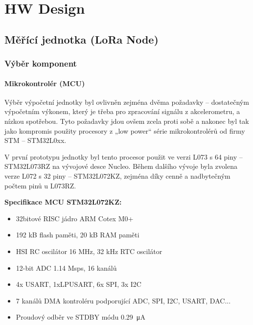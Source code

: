 \chapter{HW Design}
\section{Měřící jednotka (LoRa Node)}

\subsection{Výběr komponent}
\subsubsection{Mikrokontrolér (MCU)}
    Výběr výpočetní jednotky byl ovlivněn zejména dvěma požadavky – dostatečným výpočetním výkonem, který je třeba pro zpracování signálu z akcelerometru, a nízkou spotřebou. Tyto požadavky jdou ovšem zcela proti sobě a nakonec byl tak jako kompromis použity procesory z „low power“ série mikrokontrolérů od firmy STM – STM32L0xx.
    
    V první prototypu jednotky byl tento procesor použit ve verzi L073 s 64 piny – STM32L073RZ na vývojové desce Nucleo. Během dalšího vývoje byla zvolena verze L072 s 32 piny – STM32L072KZ, zejména díky cenně a nadbytečným počtem pinů u L073RZ.
    
    \textbf{Specifikace MCU STM32L072KZ:}
    \begin{itemize}
            \item 32bitové RISC jádro ARM Cotex M0+
            \item 192 kB flash paměti, 20 kB RAM paměti
            \item HSI RC oscilátor 16 MHz, 32 kHz RTC oscilátor 
            \item 12-bit ADC 1.14 Msps, 16 kanálů
            \item 4x USART, 1xLPUSART, 6x SPI, 3x I2C
            \item 7 kanálů DMA kontroléru podporující  ADC, SPI, I2C, USART, DAC...
            \item Proudový odběr ve STDBY módu \SI{0.29}{\micro\ampere} 
        \end{itemize}
        
